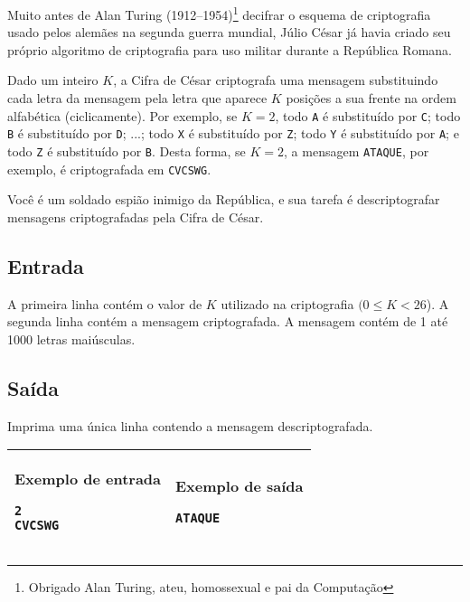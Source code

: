 Muito antes de Alan Turing (1912--1954)\footnote{Obrigado Alan Turing, ateu,
homossexual e pai da Computação} decifrar o esquema de criptografia usado
pelos alemães na segunda guerra mundial, Júlio César já havia criado seu próprio
algoritmo de criptografia para uso militar durante a República Romana.

Dado um inteiro $K$, a Cifra de César criptografa uma mensagem substituindo cada
letra da mensagem pela letra que aparece $K$ posições a sua frente na ordem
alfabética (ciclicamente). Por exemplo, se $K=2$, todo \verb|A| é substituído por
\verb|C|;
todo \verb|B| é substituído por \verb|D|; ...; todo \verb|X| é substituído por
\verb|Z|; todo \verb|Y| é
substituído por \verb|A|; e todo \verb|Z| é substituído por \verb|B|. Desta forma, se $K=2$, a
mensagem \verb|ATAQUE|, por exemplo, é criptografada em \verb|CVCSWG|.

Você é um soldado espião inimigo da República, e sua tarefa é descriptografar
mensagens criptografadas pela Cifra de César.

\subsection*{Entrada}

A primeira linha contém o valor de $K$ utilizado na criptografia $(0 \leq K <
        26$). A segunda linha contém a mensagem criptografada. A mensagem contém
de 1 até 1000 letras maiúsculas.

\subsection*{Saída}

Imprima uma única linha contendo a mensagem descriptografada.

\begin{table}[!h]
\centering
\begin{tabular}{|l|l|}
\hline
\begin{minipage}[t]{3in}
\textbf{Exemplo de entrada}
\begin{verbatim}
2
CVCSWG
\end{verbatim}
\vspace{1mm}
\end{minipage}
&
\begin{minipage}[t]{3in}
\textbf{Exemplo de saída}
\begin{verbatim}
ATAQUE
\end{verbatim}
\vspace{1mm}
\end{minipage} \\
\hline
\end{tabular}
\end{table}

